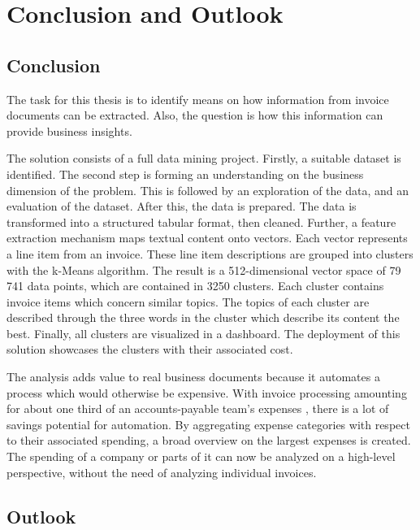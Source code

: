 \chapter{Conclusion and Outlook}
\section{Conclusion}

The task for this thesis is to identify means on how information from invoice documents can be extracted. Also, the question is how this information can provide business insights.

The solution consists of a full data mining project. Firstly, a suitable dataset is identified. The second step is forming an understanding on the business dimension of the problem. This is followed by an exploration of the data, and an evaluation of the dataset. After this, the data is prepared. The data is transformed into a structured tabular format, then cleaned. Further, a feature extraction mechanism maps textual content onto vectors. Each vector represents a line item from an invoice. These line item descriptions are grouped into clusters with the k-Means algorithm. The result is a 512-dimensional vector space of 79 741 data points, which are contained in 3250 clusters. Each cluster contains invoice items which concern similar topics. The topics of each cluster are described through the three words in the cluster which describe its content the best. Finally, all clusters are visualized in a dashboard. The deployment of this solution showcases the clusters with their associated cost. 

The analysis adds value to real business documents because it automates a process which would otherwise be expensive. With invoice processing amounting for about one third of an accounts-payable team's expenses \cite{manualInvoiceProcessing}, there is a lot of savings potential for automation.
 By aggregating expense categories with respect to their associated spending, a broad overview on the largest expenses is created. The spending of a company or parts of it can now be analyzed on a high-level perspective, without the need of analyzing individual invoices.

\section{Outlook}


